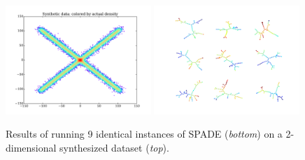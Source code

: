 \documentclass{article}
\begin{document}
\begin{figure}
\begin{center}
\includegraphics[width = 0.49\textwidth]{figures/synthetic_data.pdf}
\includegraphics[width = 0.49\textwidth]{figures/spade_multiview.pdf}
\caption{Results of running 9 identical instances of SPADE (\textit{bottom}) on a 2-dimensional synthesized dataset (\textit{top}). }
\label{fig:spade_analysis}
\end{center}
\end{figure}



\end{document}
